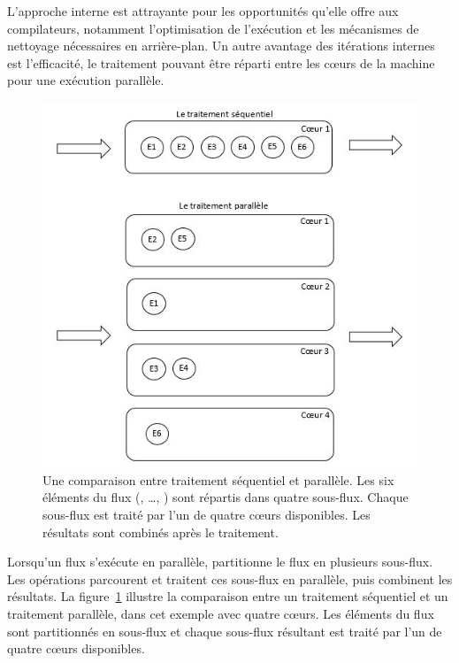 L'approche interne est attrayante pour les opportunit\'es qu'elle offre aux compilateurs, notamment l'optimisation de l'exécution et les m\'ecanismes de nettoyage n\'ecessaires en arri\`ere-plan. Un autre avantage des it\'erations internes est l'efficacit\'e, le traitement pouvant \^etre r\'eparti entre les cœurs de la machine pour une ex\'ecution parall\`ele.


\begin{figure}
\centering
     \includegraphics[width=1.0\textwidth]{Figures/ComparisonSequentialVsParallel.jpg}
      \caption[Une comparaison entre traitement s\'equentiel et parall\`ele.]{Une comparaison entre traitement s\'equentiel et parall\`ele. Les six \'el\'ements du flux (, \ldots,  ) sont r\'epartis dans quatre sous-flux. Chaque sous-flux est trait\'e par l'un de quatre cœurs disponibles. Les r\'esultats sont combin\'es apr\`es le traitement.}
       \label{ComparisonSequentialVsParallel.fig}
\end{figure}


Lorsqu'un flux s'ex\'ecute en parall\`ele,  partitionne le flux en plusieurs sous-flux. Les op\'erations parcourent et traitent ces sous-flux en parall\`ele, puis combinent les r\'esultats. La figure~\ref{ComparisonSequentialVsParallel.fig} illustre la comparaison entre  un traitement s\'equentiel et un traitement parall\`ele, dans cet exemple avec quatre c\oe{}urs. Les \'el\'ements du flux sont partitionn\'es en sous-flux et chaque sous-flux r\'esultant est trait\'e par l'un de quatre cœurs disponibles.  



